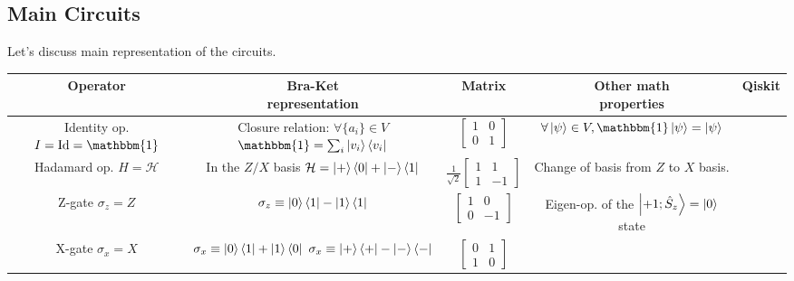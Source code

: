 \subsection*{Main Circuits}
Let's discuss main representation of the circuits.

\begin{table}[ht!]
  \begin{tabular}{|c|c|c|c|c|}
    \hline
    Operator & \makecell{Bra-Ket \\ representation} & Matrix & \makecell{Other math \\ properties} & Qiskit \\
    \hline 
    \hline
    \makecell{Identity op. \\ $I=\text{Id}=\mathbbm{1}$}  & \makecell{Closure relation: \\ $\forall \{a_i\}\in V$ \\ $\mathbbm{1}=\sum_i \ket{v_i}\bra{v_i}$ } & $\begin{bmatrix} 1 & 0 \\ 0 & 1 \end{bmatrix}$ & $\forall \ket{\psi} \in V , \mathbbm{1}\ket{\psi}=\ket{\psi}$ &  \\
    \hline
    \makecell{Hadamard op. \\ $H=\mathcal{H}$ } & \makecell{In the $Z/X$ basis \\ $\mathcal{H}=\ket{+}\bra{0} + \ket{-}\bra{1}$} &
    $\frac{1}{\sqrt{2}}\begin{bmatrix} 1 & 1 \\ 1 & -1 \end{bmatrix}$ & \makecell{Change of basis from \\ $Z$ to $X$ basis.} & \\
    \hline 
    \makecell{Z-gate \\ $\sigma_z = Z$} & $\sigma_z \equiv \ket{0}\bra{1} - \ket{1}\bra{1}$ & $ \begin{bmatrix} 1 & 0 \\ 0 & -1 \end{bmatrix} $ &
    \makecell{Eigen-op. of the \\ $\ket{+1;\hat{S}_z}=\ket{0}$ state} & \\
    \hline
    \makecell{X-gate \\ $\sigma_x = X$} & \makecell{$\sigma_x \equiv \ket{0}\bra{1}+\ket{1}\bra{0}$ \\ $\sigma_x \equiv \ket{+}\bra{+} - \ket{-}\bra{-}$ } & $\begin{bmatrix} 0 & 1 \\ 1 & 0 \end{bmatrix}$ & 

\end{tabular}
\end{table}
